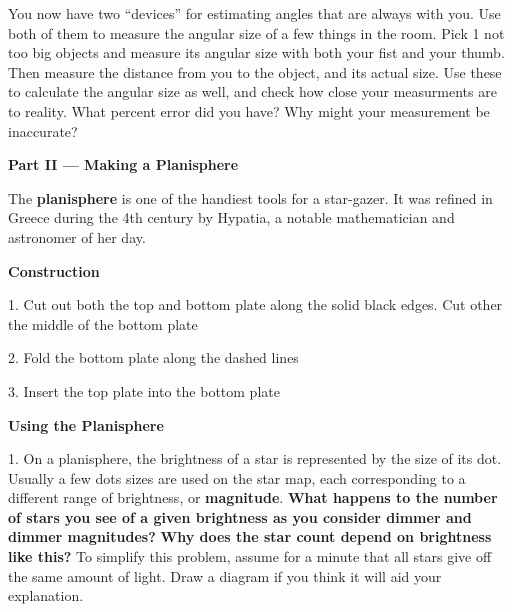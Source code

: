 \documentclass[10pt]{article}%
\begin{document}
\begin{flushleft}
\vspace{.1in}

You now have two ``devices'' for estimating angles that are always
with you.  Use both of them to measure the angular size of a few things in the room.  Pick 1 not too big objects and measure its angular size with both your fist and your thumb.  Then measure the distance from you to the object, and its actual size.  Use these to calculate the angular size as well, and check how close your measurments are to reality.  What percent error did you have?  Why might your measurement be inaccurate?

\vspace{0.1in}

\large{\textbf{Part II --- Making a Planisphere}}

\vspace{0.1in}

The \textbf{planisphere} is one of the handiest tools for a star-gazer. It was
refined in Greece during the 4th century by Hypatia, a notable mathematician
and astronomer of her day.

\vspace{0.1in}

\textbf{Construction}
\vspace{0.1in}

1. Cut out both the top and bottom plate along the solid black edges. Cut other the middle of the bottom plate

2. Fold the bottom plate along the dashed lines

3. Insert the top plate into the bottom plate

\vspace{.1in}

\textbf{Using the Planisphere}

\vspace{.1in}

1. On a planisphere, the brightness of a star is represented by the size of its
dot. Usually a few dots sizes are used on the star map, each corresponding to a
different range of brightness, or \textbf{magnitude}. \textbf{What happens to
the number of stars you see of a given brightness as you consider dimmer and
dimmer magnitudes?} \textbf{Why does the star count depend on brightness like
this?} To simplify this problem, assume for a minute that all stars give off
the same amount of light.  Draw a diagram if you think it will aid your
explanation.


\end{flushleft}
\end{document}
